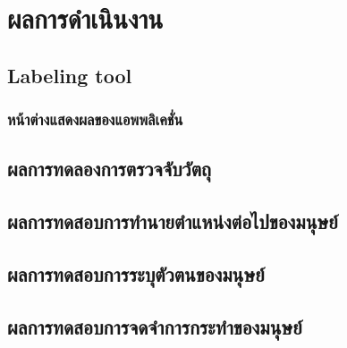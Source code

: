 \chapter{ผลการดำเนินงาน}
\section{Labeling tool}
\subsection{หน้าต่างแสดงผลของแอพพลิเคชั่น}


\clearpage
\section{ผลการทดลองการตรวจจับวัตถุ}


\section{ผลการทดสอบการทำนายตำแหน่งต่อไปของมนุษย์}
%

\section{ผลการทดสอบการระบุตัวตนของมนุษย์}
%

\section{ผลการทดสอบการจดจำการกระทำของมนุษย์}


%

%